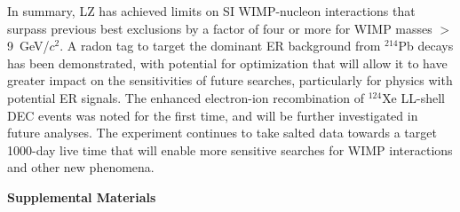 \documentclass[%
 reprint,
 superscriptaddress,
 amsmath,amssymb,
 prl,
floatfix,
]{revtex4-2}
\begin{document}
In summary, LZ has achieved limits on SI WIMP-nucleon interactions that surpass previous best exclusions by a factor of four or more for WIMP masses $>$9~GeV/$c^2$. A radon tag to target the dominant ER background from $^{214}$Pb decays has been demonstrated, with potential for optimization that will allow it to have greater impact on the sensitivities of future searches, particularly for physics with potential ER signals. The enhanced electron-ion recombination of $^{124}$Xe LL-shell DEC events was noted for the first time, and will be further investigated in future analyses. The experiment continues to take salted data towards a target 1000-day live time that will enable more sensitive searches for WIMP interactions and other new phenomena.




\appendix








\clearpage
\pagebreak

\widetext
\begin{center}
\textbf{\large Supplemental Materials}
\end{center}
\setcounter{equation}{0}
\setcounter{figure}{0}
\setcounter{table}{0}
\setcounter{page}{1}
\makeatletter
\renewcommand{\theequation}{S\arabic{equation}}
\renewcommand{\thefigure}{S\arabic{figure}}
\renewcommand{\thetable}{S\arabic{table}}


\end{document}
